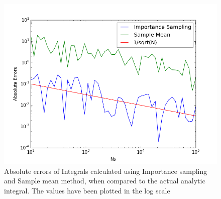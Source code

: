 \documentclass[a4paper,11pt]{article}
\begin{document}
\begin{figure}[ht]
	\centering
    \includegraphics[scale=0.80]{Errors.png}
    \caption{Absolute errors of Integrals calculated using Importance sampling and Sample mean method, when compared to the actual analytic integral. The values have been plotted in the log scale}
	\label{fig:errors}
\end{figure}
\end{document}
